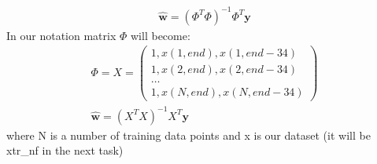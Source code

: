 \documentclass{article}
\newcommand{\vect}[1]{\boldsymbol{#1}} %
\begin{document}
\begin{enumerate}[label=(\alph*)]
					\begin{gather*}
					\hat{\vect{w}} = (\Phi^T \Phi)^{-1} \Phi^T \vect{y}
					\end{gather*}
					In our notation matrix $\Phi$ will become:
					\begin{gather*}
						\Phi = X = 
						\begin{pmatrix}
						1, x(1, end), x(1, end - 34)\\
						1, x(2, end), x(2, end - 34)\\
						\ldots \\
						1, x(N, end), x(N, end -34)
						\end{pmatrix} \\
						\hat{\vect{w}} = (X^T X)^{-1} X^T \vect{y}
					\end{gather*}
					where N is a number of training data points and x is our dataset (it will be xtr\_nf in the next task)
			\end{enumerate}
\end{document}
